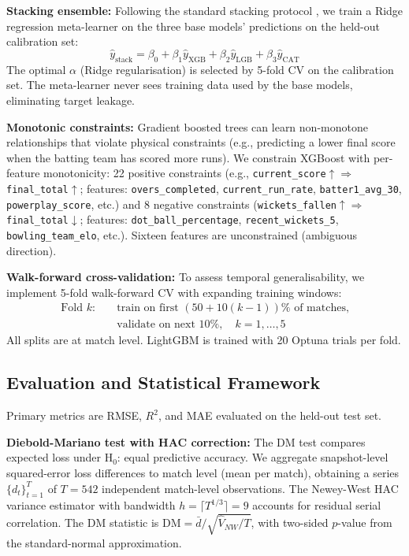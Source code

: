 \documentclass[10pt,a4paper,twocolumn]{article}
\begin{document}
\textbf{Stacking ensemble:} Following the standard stacking protocol \citep{Wolpert1992}, we train a Ridge regression meta-learner on the three base models' predictions on the held-out calibration set:
\begin{equation}
\hat{y}_\text{stack} = \beta_0 + \beta_1 \hat{y}_\text{XGB} + \beta_2 \hat{y}_\text{LGB} + \beta_3 \hat{y}_\text{CAT}
\end{equation}
The optimal $\alpha$ (Ridge regularisation) is selected by 5-fold CV on the calibration set. The meta-learner never sees training data used by the base models, eliminating target leakage.

\textbf{Monotonic constraints:} Gradient boosted trees can learn non-monotone relationships that violate physical constraints (e.g., predicting a lower final score when the batting team has scored more runs). We constrain XGBoost with per-feature monotonicity: 22 positive constraints (e.g., \texttt{current\_score}$\uparrow \Rightarrow$ \texttt{final\_total}$\uparrow$; features: \texttt{overs\_completed}, \texttt{current\_run\_rate}, \texttt{batter1\_avg\_30}, \texttt{powerplay\_score}, etc.) and 8 negative constraints (\texttt{wickets\_fallen}$\uparrow \Rightarrow$ \texttt{final\_total}$\downarrow$; features: \texttt{dot\_ball\_percentage}, \texttt{recent\_wickets\_5}, \texttt{bowling\_team\_elo}, etc.). Sixteen features are unconstrained (ambiguous direction).

\textbf{Walk-forward cross-validation:} To assess temporal generalisability, we implement 5-fold walk-forward CV with expanding training windows:
\begin{align*}
\text{Fold } k: \quad & \text{train on first } (50+10(k-1))\% \text{ of matches,} \\
                       & \text{validate on next } 10\%,\quad k = 1, \ldots, 5
\end{align*}
All splits are at match level. LightGBM is trained with 20 Optuna trials per fold.

\subsection{Evaluation and Statistical Framework}
\label{sec:stats}

Primary metrics are RMSE, $R^2$, and MAE evaluated on the held-out test set.

\textbf{Diebold-Mariano test with HAC correction:} The DM test \citep{diebold1995comparing} compares expected loss under H$_0$: equal predictive accuracy. We aggregate snapshot-level squared-error loss differences to match level (mean per match), obtaining a series $\{d_t\}_{t=1}^T$ of $T=542$ independent match-level observations. The Newey-West HAC variance estimator \citep{newey1987simple} with bandwidth $h = \lceil T^{1/3} \rceil = 9$ accounts for residual serial correlation. The DM statistic is $\text{DM} = \bar{d}/\sqrt{\hat{V}_{NW}/T}$, with two-sided $p$-value from the standard-normal approximation.
\end{document}
